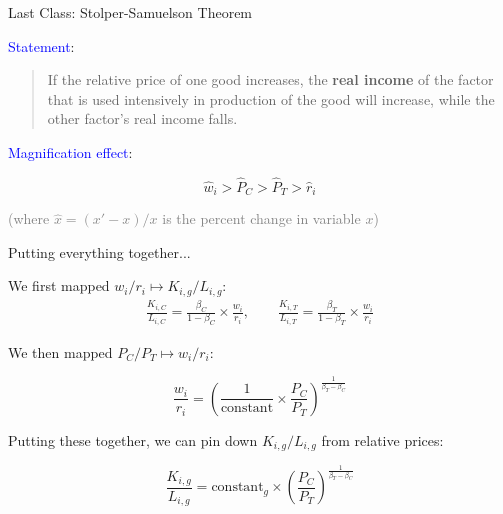 \documentclass[notes,11pt, aspectratio=169, xcolor=table]{beamer}
\newcommand{\blue}[1]{\textcolor{blue}{#1}}
\newenvironment{wideitemize}{\itemize\addtolength{\itemsep}{10pt}}{\enditemize}
\begin{document}
\begin{frame}{Last Class: Stolper-Samuelson Theorem}

        \begin{wideitemize}
            \item \blue{Statement}:

            \begin{quote}
                If the relative price of one good increases, the \textbf{real income} of the factor that is used intensively in production of the good will increase, while the other factor’s real income falls.
            \end{quote}

            \item \blue{Magnification effect}:

            \begin{equation*}
            \hat{w}_i > \hat{P}_C > \hat{P}_T > \hat{r}_i 
         \end{equation*}

         \textcolor{gray}{(where $\hat{x} = (x'-x)/x$ is the percent change in variable $x$)}

\end{wideitemize}
\end{frame}


\begin{frame}{Putting everything together...}

        \begin{wideitemize}
            \item We first mapped $w_i/r_i \mapsto K_{i,g}/L_{i,g}$:
\begin{eqnarray*}\label{eq: capital-labor}
    \frac{K_{i,C}}{L_{i,C}} = \frac{\beta_C}{1-\beta_C} \times \frac{w_i}{r_i}, \qquad \frac{K_{i,T}}{L_{i,T}} = \frac{\beta_T}{1-\beta_T} \times \frac{w_i}{r_i} 
\end{eqnarray*}        
            \item We then mapped $P_C/P_T \mapsto w_i/r_i$:

            \begin{equation*}
                \frac{w_i}{r_i} = \left( \frac{1}{\text{constant}} \times  \frac{P_{C}}{P_{T}} \right)^{\frac{1}{\beta_T-\beta_C}}
            \end{equation*}

            \item Putting these together, we can pin down $K_{i,g}/L_{i,g}$ from relative prices:

            \begin{equation*}
                \frac{K_{i,g}}{L_{i,g}} = \text{constant}_g \times  \left(  \frac{P_{C}}{P_{T}} \right)^{\frac{1}{\beta_T-\beta_C}}
            \end{equation*}

\end{wideitemize}
\end{frame}
\end{document}
